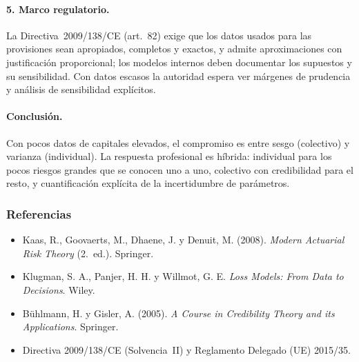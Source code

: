 \documentclass[a4paper,12pt]{article}
\begin{document}
\paragraph{5. Marco regulatorio.} La Directiva~2009/138/CE (art.~82) exige que los datos usados para las provisiones sean apropiados, completos y exactos, y admite aproximaciones con justificaci\'on proporcional; los modelos internos deben documentar los supuestos y su sensibilidad. Con datos escasos la autoridad espera ver m\'argenes de prudencia y an\'alisis de sensibilidad expl\'icitos.

\paragraph{Conclusi\'on.} Con pocos datos de capitales elevados, el compromiso es entre sesgo (colectivo) y varianza (individual). La respuesta profesional es h\'ibrida: individual para los pocos riesgos grandes que se conocen uno a uno, colectivo con credibilidad para el resto, y cuantificaci\'on expl\'icita de la incertidumbre de par\'ametros.

\subsubsection*{Referencias}
\begin{itemize}[leftmargin=*,itemsep=0pt]
\item Kaas, R., Goovaerts, M., Dhaene, J. y Denuit, M. (2008). \emph{Modern Actuarial Risk Theory} (2.\textordfeminine\ ed.). Springer.
\item Klugman, S. A., Panjer, H. H. y Willmot, G. E. \emph{Loss Models: From Data to Decisions}. Wiley.
\item B\"uhlmann, H. y Gisler, A. (2005). \emph{A Course in Credibility Theory and its Applications}. Springer.
\item Directiva 2009/138/CE (Solvencia~II) y Reglamento Delegado (UE) 2015/35.
\end{itemize}
\end{document}
